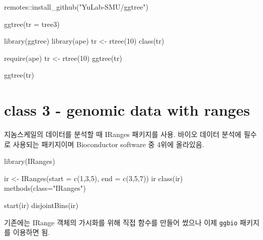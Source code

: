 \documentclass[
]{book}
\newenvironment{Shaded}{\begin{snugshade}}{\end{snugshade}}
\newcommand{\AttributeTok}[1]{\textcolor[rgb]{0.77,0.63,0.00}{#1}}
\newcommand{\DecValTok}[1]{\textcolor[rgb]{0.00,0.00,0.81}{#1}}
\newcommand{\FunctionTok}[1]{\textcolor[rgb]{0.00,0.00,0.00}{#1}}
\newcommand{\NormalTok}[1]{#1}
\newcommand{\OtherTok}[1]{\textcolor[rgb]{0.56,0.35,0.01}{#1}}
\newcommand{\SpecialCharTok}[1]{\textcolor[rgb]{0.00,0.00,0.00}{#1}}
\newcommand{\StringTok}[1]{\textcolor[rgb]{0.31,0.60,0.02}{#1}}
\begin{document}
\begin{Shaded}
\begin{Highlighting}[]
\NormalTok{remotes}\SpecialCharTok{::}\FunctionTok{install\_github}\NormalTok{(}\StringTok{"YuLab{-}SMU/ggtree"}\NormalTok{)}

\FunctionTok{ggtree}\NormalTok{(}\AttributeTok{tr =}\NormalTok{ tree3)}

\FunctionTok{library}\NormalTok{(ggtree)}
\FunctionTok{library}\NormalTok{(ape)}
\NormalTok{tr }\OtherTok{\textless{}{-}} \FunctionTok{rtree}\NormalTok{(}\DecValTok{10}\NormalTok{)}
\FunctionTok{class}\NormalTok{(tr)}

\FunctionTok{require}\NormalTok{(ape) }
\NormalTok{tr }\OtherTok{\textless{}{-}} \FunctionTok{rtree}\NormalTok{(}\DecValTok{10}\NormalTok{)}
\FunctionTok{ggtree}\NormalTok{(tr)}

\FunctionTok{ggtree}\NormalTok{(tr)}
\end{Highlighting}
\end{Shaded}

\hypertarget{day3_class3}{%
\section{class 3 - genomic data with ranges}\label{day3_class3}}

지놈스케일의 데이터를 분석할 때 IRanges 패키지를 사용. 바이오 데이터 분석에 필수로 사용되는 패키지이며 Bioconductor software 중 4위에 올라있음.

\begin{Shaded}
\begin{Highlighting}[]
\FunctionTok{library}\NormalTok{(IRanges)}

\NormalTok{ir }\OtherTok{\textless{}{-}} \FunctionTok{IRanges}\NormalTok{(}\AttributeTok{start =} \FunctionTok{c}\NormalTok{(}\DecValTok{1}\NormalTok{,}\DecValTok{3}\NormalTok{,}\DecValTok{5}\NormalTok{), }\AttributeTok{end =} \FunctionTok{c}\NormalTok{(}\DecValTok{3}\NormalTok{,}\DecValTok{5}\NormalTok{,}\DecValTok{7}\NormalTok{))}
\NormalTok{ir}
\FunctionTok{class}\NormalTok{(ir)}
\FunctionTok{methods}\NormalTok{(}\AttributeTok{class=}\StringTok{"IRanges"}\NormalTok{)}

\FunctionTok{start}\NormalTok{(ir)}
\FunctionTok{disjointBins}\NormalTok{(ir)}
\end{Highlighting}
\end{Shaded}

기존에는 IRange 객체의 가시화를 위해 직접 함수를 만들어 썼으나 이제 \texttt{ggbio} 패키지를 이용하면 됨.
\end{document}
